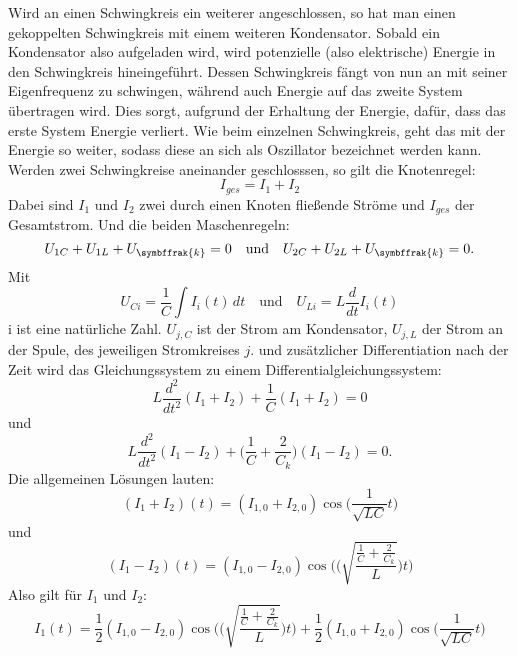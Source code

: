 Wird an einen Schwingkreis ein weiterer angeschlossen, so hat man einen gekoppelten Schwingkreis mit einem weiteren Kondensator. Sobald ein Kondensator also aufgeladen wird, wird potenzielle (also elektrische) Energie in den Schwingkreis hineingeführt. Dessen Schwingkreis fängt von nun an mit seiner Eigenfrequenz zu schwingen, während auch Energie auf das zweite System übertragen wird. Dies sorgt, aufgrund der Erhaltung der Energie, dafür, dass das erste System Energie verliert.
Wie beim einzelnen Schwingkreis, geht das mit der Energie so weiter, sodass diese an sich als Oszillator bezeichnet werden kann.
Werden zwei Schwingkreise aneinander geschlosssen, so gilt die Knotenregel:
\begin{equation}
    I_{ges} = I_1 + I_2
\end{equation}
Dabei sind \(I_1\) und \(I_2\) zwei durch einen Knoten fließende Ströme und \(I_{ges}\) der Gesamtstrom.
Und die beiden Maschenregeln:
\begin{equation}
    U_{1C} + U_{1L} + U_{\symbffrak{k}} = 0
    \quad\textrm{und}\quad
    U_{2C} + U_{2L} + U_{\symbffrak{k}} = 0.
\end{equation} 
Mit
\begin{equation}
    U_{Ci} = \frac{1}{C} \int I_i(t) \,{d}t
    \quad\textrm{und}\quad
    U_{Li} = L \frac{d}{dt} I_i(t)
\end{equation}
i ist eine natürliche Zahl.
\(U_{j,C}\) ist der Strom am Kondensator, \(U_{j,L}\) der Strom an der Spule, des jeweiligen Stromkreises \(j\).
und zusätzlicher Differentiation nach der Zeit wird das Gleichungssystem zu einem Differentialgleichungssystem:
\begin{equation}
L \frac{d^2}{dt^2} (I_1 + I_2) + \frac{1}{C}(I_1+I_2) = 0
\end{equation}
und
\begin{equation}
L \frac{d^2}{dt^2} (I_1 - I_2) + \Biggl(\frac{1}{C} + \frac{2}{C_k} \Biggr)(I_1 - I_2) = 0.
\end{equation}
Die allgemeinen Lösungen lauten:
\begin{equation}
    (I_1+I_2)(t) = (I_{1,0} + I_{2,0}) \cos\Biggl(\frac{1}{\sqrt{LC}}t\Biggr)
\end{equation}
und
\begin{equation}
    (I_1-I_2)(t) = (I_{1,0} - I_{2,0}) \cos\Biggl(\Biggl(\sqrt{\frac{\frac{1}{C}+\frac{2}{C_k}}{L}}\Biggr)t\Biggr)
\end{equation}
Also gilt für \(I_1\) und \(I_2\):
\begin{equation}
    I_1(t) = \frac{1}{2}(I_{1,0}-I_{2,0})\cos\Biggl(\Biggl(\sqrt{\frac{\frac{1}{C}+\frac{2}{C_k}}{L}}\Biggr)t\Biggr)+\frac{1}{2}(I_{1,0}+I_{2,0})\cos\Biggl(\frac{1}{\sqrt{LC}}t\Biggr)
\end{equation}
